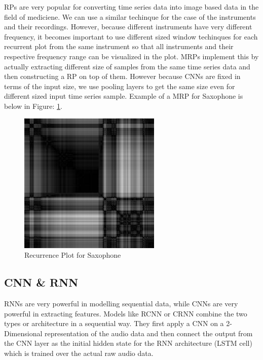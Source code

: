 \documentclass[letterpaper, 12 pt, conference]{ieeeconf}  %
\begin{document}
RPs are very popular for converting time series data into image based data in the field of mediciene. We can use a similar techinque for the case of the instruments and their recordings. However, because different instruments have very different frequency, it becomes important to use different sized window techinques for each recurrent plot from the same instrument so that all instruments and their respective frequency range can be visualized in the plot. MRPs implement this by actually extracting different size of samples from the same time series data and then constructing a RP on top of them. However because CNNs are fixed in terms of the input size, we use pooling layers to get the same size even for different sized input time series sample. Example of a MRP for Saxophone is below in Figure: \ref{fig:MRP_Sax}.	
\begin{figure}[!h]
\centering
\includegraphics[scale=0.40]{../figs/mrp/sax.jpg}	
\caption{Recurrence Plot for Saxophone}
\label{fig:MRP_Sax} 
\end{figure}

\subsection{CNN \& RNN}
RNNs are very powerful in modelling sequential data, while CNNs are very powerful in extracting features. Models like RCNN \cite{cnn_rnn_sleep_staging} or CRNN \cite{crnn} combine the two types or architecture in a sequential way. They first apply a CNN on a 2-Dimensional representation of the audio data and then connect the output from the CNN layer as the initial hidden state for the RNN architecture (LSTM cell) which is trained over the actual raw audio data.
\end{document}

